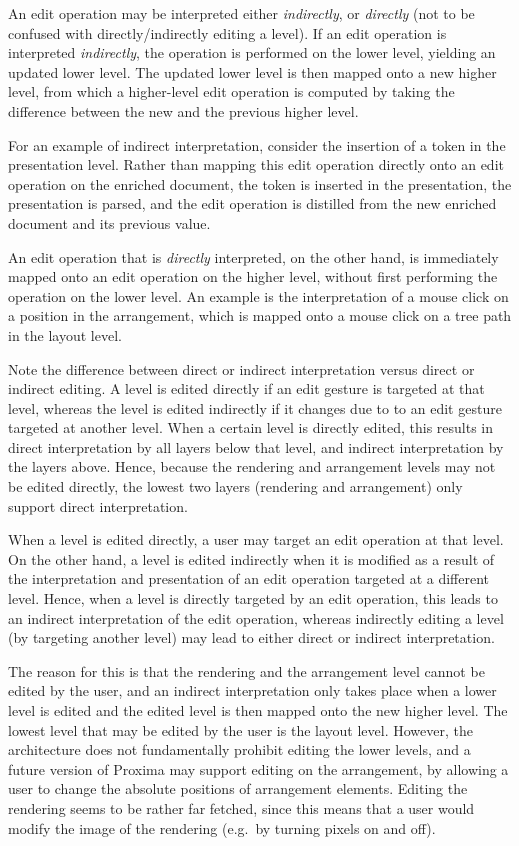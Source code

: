 \documentclass{speauth}
\begin{document}
An edit operation may be interpreted either {\em indirectly}, or {\em directly} (not to be confused with directly/indirectly editing a level). If an edit operation is interpreted {\em indirectly}, the operation is performed on the lower level, yielding an updated lower level. The updated lower level is then mapped onto a new higher level, from which a higher-level edit operation is computed by taking the difference between the new and the previous higher level.

For an example of indirect interpretation, consider the insertion of a token in the presentation level. 
Rather than mapping this edit operation directly onto an edit operation on the enriched document, the token is inserted in the presentation, the presentation is parsed, and the edit operation is distilled from the new enriched document and its previous value.

An edit operation that is {\em directly} interpreted, on the other hand, is immediately mapped onto an edit operation on the higher level, without first performing the operation on the lower level. An example is the interpretation of a mouse click on a position in the arrangement, which is mapped onto a mouse click on a tree path in the layout level. 

Note the difference between direct or indirect interpretation versus direct or indirect editing. A level is edited directly if an edit gesture is targeted at that level, whereas the level is edited indirectly if it changes due to to an edit gesture targeted at another level. When a certain level is directly edited, this results in direct interpretation by all layers below that level, and indirect interpretation by the layers above. Hence, because the rendering and arrangement levels may not be edited directly, the lowest two layers (rendering and arrangement) only support direct interpretation.

\bc When a level is edited directly, a user may target an edit operation at that level. On the other hand, a level is edited indirectly when it is modified as a result of the interpretation and presentation of  an edit operation targeted at a different level. Hence, when a level is directly targeted by an edit operation, this leads to an indirect interpretation of the edit operation, whereas indirectly editing a level (by targeting another level) may lead to either direct or indirect interpretation. \ec



\bc The reason for this is that the rendering and the arrangement level cannot be edited by the user, and an indirect interpretation only takes place when a lower level is edited and the edited level is then mapped onto the new higher level. The lowest level that may be edited by the user is the layout level. However, the architecture does not fundamentally prohibit editing the lower levels, and a future version of Proxima may support editing on the arrangement, by allowing a user to change the absolute positions of arrangement elements. Editing the rendering seems to be rather far fetched, since this means that a user would modify the image of the rendering (e.g.\ by turning pixels on and off).
\ec
\end{document}
